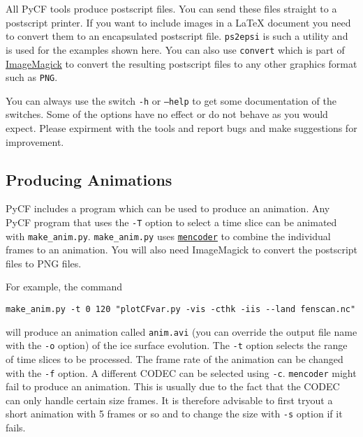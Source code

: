 All PyCF tools produce postscript files. You can send these files straight to a postscript printer. If you want to include images in a {\LaTeX} document you need to convert them to an encapsulated postscript file. \texttt{ps2epsi} is such a utility and is used for the examples shown here. You can also use \texttt{convert} which is part of \href{http://www.imagemagick.org/script/index.php}{ImageMagick} to convert the resulting postscript files to any other graphics format such as \texttt{PNG}.

You can always use the switch \texttt{-h} or \texttt{--help} to get some documentation of the switches. Some of the options have no effect or do not behave as you would expect. Please expirment with the tools and report bugs and make suggestions for improvement. 











\subsection{Producing Animations}
PyCF includes a program which can be used to produce an animation. Any PyCF program that uses the \texttt{-T} option to select a time slice can be animated with \texttt{make\_anim.py}. \texttt{make\_anim.py} uses \href{http://www.mplayerhq.hu/homepage/design7/news.html}{\texttt{mencoder}} to combine the individual frames to an animation. You will also need ImageMagick to convert the postscript files to PNG files.

For example, the command
\begin{verbatim}
make_anim.py -t 0 120 "plotCFvar.py -vis -cthk -iis --land fenscan.nc"
\end{verbatim}
will produce an animation called \texttt{anim.avi} (you can override the output file name with the \texttt{-o} option) of the ice surface evolution. The \texttt{-t} option selects the range of time slices to be processed. The frame rate of the animation can be changed with the \texttt{-f} option. A different CODEC can be selected using \texttt{-c}. \texttt{mencoder} might fail to produce an animation. This is usually due to the fact that the CODEC can only handle certain size frames. It is therefore advisable to first tryout a short animation with 5 frames or so and to change the size with \texttt{-s} option if it fails.

